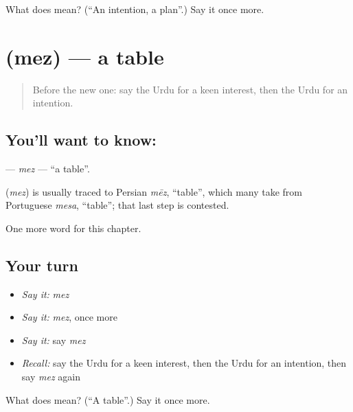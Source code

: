 \begin{tcolorbox}[breakable,colback=teal!4,colframe=teal!35!black,title={Before you move on}]
What does  mean? (\textquotedblleft{}An intention, a plan\textquotedblright{}.) Say it once more.
\end{tcolorbox}
\section[\texorpdfstring{\ur{میز} (mez)}{میز (mez)}]{ (mez) — a table}

\label{lesson:UR-C105-mez}



\begin{quote}
Before the new one: say the Urdu for a keen interest, then the Urdu for an intention.
\end{quote}

\subsection*{You'll want to know: }
\textbf{} — \emph{mez} — \textquotedblleft{}a table\textquotedblright{}.

\begin{cousinweb}
\textbf{} (\emph{mez}) is usually traced to Persian \emph{mēz}, \textquotedblleft{}table\textquotedblright{}, which many take from Portuguese \emph{mesa}, \textquotedblleft{}table\textquotedblright{}; that last step is contested.
\end{cousinweb}

\begin{grammarlens}[title={What you've built}]
One more word for this chapter.
\end{grammarlens}

\subsection*{Your turn}
\begin{itemize}
\raggedright
  \item \emph{Say it:} \emph{mez}
  \item \emph{Say it:} \emph{mez}, once more
  \item \emph{Say it:} say \emph{mez}
  \item \emph{Recall:} say the Urdu for a keen interest, then the Urdu for an intention, then say \emph{mez} again
\end{itemize}

\begin{tcolorbox}[breakable,colback=teal!4,colframe=teal!35!black,title={Before you move on}]
What does  mean? (\textquotedblleft{}A table\textquotedblright{}.) Say it once more.
\end{tcolorbox}

